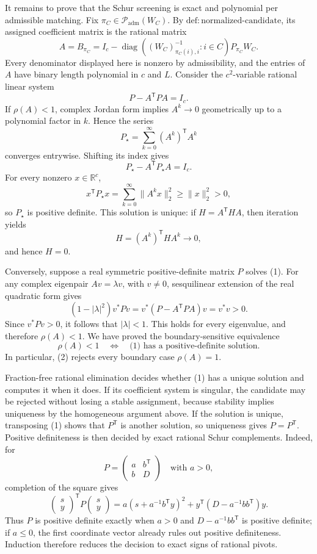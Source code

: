 It remains to prove that the Schur screening is exact and polynomial per admissible matching.  Fix \(\pi_C\in\mathcal P_{\mathrm{adm}}(W_C)\).  By \(\mathrm{def:normalized\mbox{-}candidate}\), its assigned coefficient matrix is the rational matrix
\[
 A=B_{\pi_C}
 =I_c-
   \operatorname{diag}\!\left(
   (W_C)_{\pi_C(i),i}^{-1}:i\in C\right)P_{\pi_C}W_C.
\]
Every denominator displayed here is nonzero by admissibility, and the entries of \(A\) have binary length polynomial in \(c\) and \(L\).  Consider the \(c^2\)-variable rational linear system
\[
 P-A^{\mathsf T}PA=I_c. \tag{1}
\]
If \(\rho(A)<1\), complex Jordan form implies \(A^k\to0\) geometrically up to a polynomial factor in \(k\).  Hence the series
\[
 P_\star=\sum_{k=0}^{\infty}(A^k)^{\mathsf T}A^k
\]
converges entrywise.  Shifting its index gives
\[
 P_\star-A^{\mathsf T}P_\star A=I_c.
\]
For every nonzero \(x\in\mathbb R^c\),
\[
 x^{\mathsf T}P_\star x
 =\sum_{k=0}^{\infty}\lVert A^kx\rVert_2^2
 \ge \lVert x\rVert_2^2>0,
\]
so \(P_\star\) is positive definite.  This solution is unique: if \(H=A^{\mathsf T}HA\), then iteration yields
\[
 H=(A^k)^{\mathsf T}HA^k\longrightarrow0,
\]
and hence \(H=0\).

Conversely, suppose a real symmetric positive-definite matrix \(P\) solves (1).  For any complex eigenpair \(Av=\lambda v\), with \(v\ne0\), sesquilinear extension of the real quadratic form gives
\[
 (1-|\lambda|^2)v^*Pv
 =v^*(P-A^{\mathsf T}PA)v
 =v^*v>0.
\]
Since \(v^*Pv>0\), it follows that \(|\lambda|<1\).  This holds for every eigenvalue, and therefore \(\rho(A)<1\).  We have proved the boundary-sensitive equivalence
\[
 \rho(A)<1
 \quad\Longleftrightarrow\quad
 \text{(1) has a positive-definite solution}. \tag{2}
\]
In particular, (2) rejects every boundary case \(\rho(A)=1\).

Fraction-free rational elimination decides whether (1) has a unique solution and computes it when it does.  If its coefficient system is singular, the candidate may be rejected without losing a stable assignment, because stability implies uniqueness by the homogeneous argument above.  If the solution is unique, transposing (1) shows that \(P^{\mathsf T}\) is another solution, so uniqueness gives \(P=P^{\mathsf T}\).  Positive definiteness is then decided by exact rational Schur complements.  Indeed, for
\[
 P=\begin{pmatrix}a&b^{\mathsf T}\\ b&D\end{pmatrix}
 \quad\text{with }a>0,
\]
completion of the square gives
\[
 \begin{pmatrix}s\\y\end{pmatrix}^{\!\mathsf T}
 P
 \begin{pmatrix}s\\y\end{pmatrix}
 =a\left(s+a^{-1}b^{\mathsf T}y\right)^2
  +y^{\mathsf T}\left(D-a^{-1}bb^{\mathsf T}\right)y.
\]
Thus \(P\) is positive definite exactly when \(a>0\) and \(D-a^{-1}bb^{\mathsf T}\) is positive definite; if \(a\le0\), the first coordinate vector already rules out positive definiteness.  Induction therefore reduces the decision to exact signs of rational pivots.

